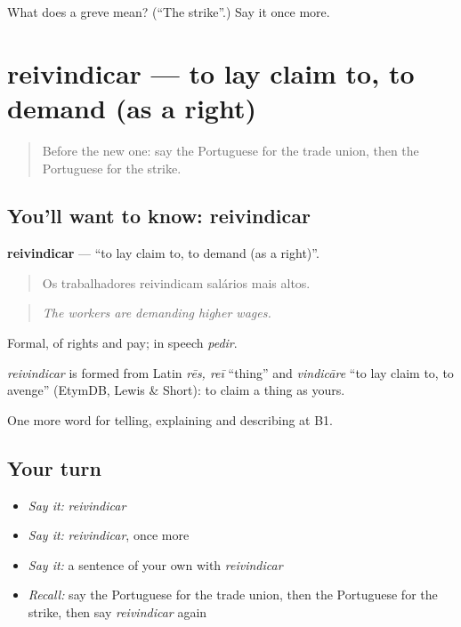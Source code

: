 \begin{tcolorbox}[breakable,colback=teal!4,colframe=teal!35!black,title={Before you move on}]
What does a greve mean? (\textquotedblleft{}The strike\textquotedblright{}.) Say it once more.
\end{tcolorbox}
\section[reivindicar]{reivindicar — to lay claim to, to demand (as a right)}

\label{lesson:PT-C358-reivindicar}



\begin{quote}
Before the new one: say the Portuguese for the trade union, then the Portuguese for the strike.
\end{quote}

\subsection*{You'll want to know: reivindicar}
\textbf{reivindicar} — \textquotedblleft{}to lay claim to, to demand (as a right)\textquotedblright{}.

\begin{quote}
Os trabalhadores reivindicam salários mais altos.
\end{quote}

\begin{quote}
\emph{The workers are demanding higher wages.}
\end{quote}

Formal, of rights and pay; in speech \emph{pedir}.

\begin{cousinweb}
\emph{reivindicar} is formed from Latin \emph{rēs, reī} \textquotedblleft{}thing\textquotedblright{} and \emph{vindicāre} \textquotedblleft{}to lay claim to, to avenge\textquotedblright{} (EtymDB, Lewis \& Short): to claim a thing as yours.
\end{cousinweb}

\begin{grammarlens}[title={What you've built}]
One more word for telling, explaining and describing at B1.
\end{grammarlens}

\subsection*{Your turn}
\begin{itemize}
\raggedright
  \item \emph{Say it:} \emph{reivindicar}
  \item \emph{Say it:} \emph{reivindicar}, once more
  \item \emph{Say it:} a sentence of your own with \emph{reivindicar}
  \item \emph{Recall:} say the Portuguese for the trade union, then the Portuguese for the strike, then say \emph{reivindicar} again
\end{itemize}


